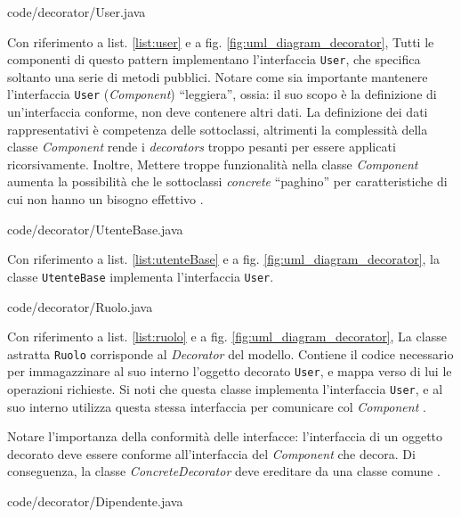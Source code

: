\documentclass[12pt]{article}
\begin{document}
\newpage

{code/decorator/User.java}

Con riferimento a list. \ref{list:user} e a fig. \ref{fig:uml_diagram_decorator}, Tutti le componenti di questo pattern implementano l’interfaccia
{\tt User}, che specifica soltanto una serie di metodi pubblici.
Notare come sia importante mantenere l'interfaccia {\tt User} ({\em Component}) ``leggiera'', ossia: il suo scopo è la definizione di un'interfaccia conforme, non deve contenere altri dati. La definizione dei dati rappresentativi è competenza delle sottoclassi, altrimenti la complessità della classe {\em Component} rende i {\em decorators} troppo pesanti per essere applicati ricorsivamente. Inoltre, Mettere troppe funzionalità nella classe {\em Component} aumenta la possibilità che le sottoclassi {\em concrete} ``paghino'' per caratteristiche di cui non hanno un bisogno effettivo \cite{gof_riferimento}.


{code/decorator/UtenteBase.java}

Con riferimento a list. \ref{list:utenteBase} e a fig. \ref{fig:uml_diagram_decorator}, la classe {\tt UtenteBase} implementa l'interfaccia {\tt User}.


{code/decorator/Ruolo.java}

Con riferimento a list. \ref{list:ruolo} e a fig. \ref{fig:uml_diagram_decorator}, 
La classe astratta {\tt Ruolo} corrisponde al {\em Decorator} del
modello. Contiene il codice necessario per immagazzinare al suo interno
l’oggetto decorato {\tt User}, e mappa verso di lui le operazioni richieste. Si noti che questa classe implementa l’interfaccia {\tt User}, e al suo interno utilizza questa stessa interfaccia per comunicare col {\em Component} \cite{gof_sunt}.

Notare l'importanza della conformità delle interfacce: l'interfaccia di un oggetto decorato deve essere conforme all'interfaccia del {\em Component} che decora. Di conseguenza, la classe {\em ConcreteDecorator} deve ereditare da una classe comune \cite{gof_riferimento}.


{code/decorator/Dipendente.java}
\end{document}
